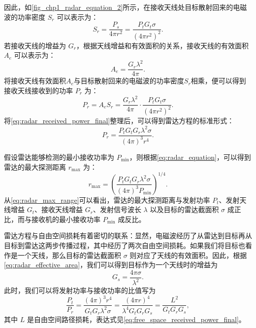 因此，如\cref{fig_chp1_radar_equation_2}所示，在接收天线处目标散射回来的电磁波的功率密度 $S_r$ 可以表示为：
\begin{equation*}
    S_r = \frac{P_s}{4 \pi r^2} = \frac{P_t G_t \sigma}{(4 \pi r^2)^2}.
    \label{eq:radar_received_power_density}
\end{equation*}
若接收天线的增益为 $G_r$，根据天线增益和有效面积的关系，接收天线的有效面积 $A_e$ 可以表示为：
\begin{equation}
    A_e = \frac{G_r \lambda^2}{4 \pi}.
    \label{eq:radar_effective_area}
\end{equation}
将接收天线有效面积\( A_e \)与目标散射回来的电磁波的功率密度\( S_r \)相乘，便可以得到接收天线接收到的功率 $P_r$ 为：
\begin{equation}
    P_r = A_e S_r  = \frac{G_r \lambda^2}{4 \pi} \cdot \frac{P_t G_t \sigma}{(4 \pi r^2)^2}.
    \label{eq:radar_received_power_final}
\end{equation}
将\cref{eq:radar_received_power_final}整理后，可以得到雷达方程的标准形式：
\begin{equation}
    P_r = \frac{P_t G_t G_r \lambda^2 \sigma}{(4 \pi)^3 r^4}.
    \label{eq:radar_equation}
\end{equation}

假设雷达能够检测的最小接收功率为 $P_{\text{min}}$，则根据\cref{eq:radar_equation}，可以得到雷达的最大探测距离 $r_{\text{max}}$ 为：
\begin{equation}
    r_{\text{max}} = \left( \frac{P_t G_t G_r \lambda^2 \sigma}{(4 \pi)^3 P_{\text{min}}} \right)^{1/4}.
    \label{eq:radar_max_range}
\end{equation}
从\cref{eq:radar_max_range}可以看出，雷达的最大探测距离与发射功率 $P_t$、发射天线增益 $G_t$、接收天线增益 $G_r$、发射信号波长 $\lambda$ 以及目标的雷达截面积 $\sigma$ 成正比，而与接收机的最小接收功率 $P_{\text{min}}$ 成反比。

雷达方程与自由空间损耗有着密切的联系：显然，电磁波经历了从雷达到目标再从目标到雷达这两步传播过程，其中经历了两次自由空间损耗。如果我们将目标也看作是一个天线，那么目标的雷达截面积 $\sigma$ 则对应了天线的有效面积。因此，根据\cref{eq:radar_effective_area}，我们可以得到目标作为一个天线时的增益为
\[
    G_s =  \frac{4 \pi \sigma}{\lambda^2}.
\]
此时，我们可以将发射功率与接收功率的比值写为
\begin{equation}
    \frac{P_t}{P_r} = \frac{(4 \pi)^3 r^4}{G_t G_r \lambda^2 \sigma} =\frac{(4 \pi r)^4}{\lambda^4 G_t G_r G_s} = \frac{L^2}{G_t G_r G_s},
    \label{eq:radar_equation_gain}
\end{equation}
其中 $L$ 是自由空间路径损耗，表达式见\cref{eq:free_space_received_power_final}。

